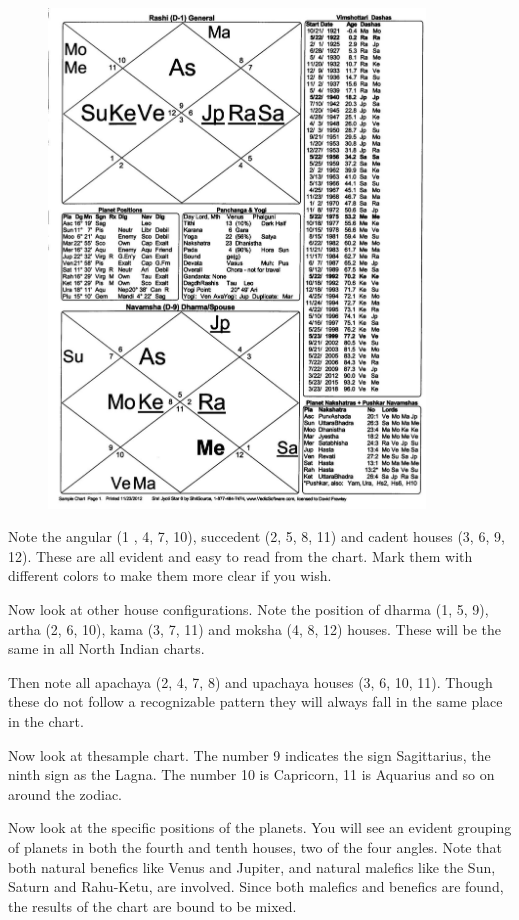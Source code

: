  \begin{figure}[h]
\centering
\includegraphics[width=10cm]{pics/lesson-1-northchart1.jpg}
\caption{}
\end{figure}


Note the angular (1 , 4, 7, 10), succedent (2, 5, 8, 11) and cadent houses (3, 6, 9, 12). These are all evident and easy to read from the chart. Mark them with different colors to make them more clear if you wish.

 

Now look at other house configurations. Note the position of dharma (1, 5, 9), artha (2, 6, 10), kama (3, 7, 11) and moksha (4, 8, 12) houses. These will be the same in all North Indian charts.

Then note all apachaya (2, 4, 7, 8) and upachaya houses (3, 6, 10, 11). Though these do not follow a recognizable pattern they will always fall in the same place in the chart.

 

Now look at thesample chart. The number 9 indicates the sign Sagittarius, the ninth sign as the Lagna. The number 10 is Capricorn, 11 is Aquarius and so on around the zodiac.

 

Now look at the specific positions of the planets. You will see an evident grouping of planets in both the fourth and tenth houses, two of the four angles. Note that both natural benefics like Venus and Jupiter, and natural malefics like the Sun, Saturn and Rahu-Ketu, are involved. Since both malefics and benefics are found, the results of the chart are bound to be mixed.

